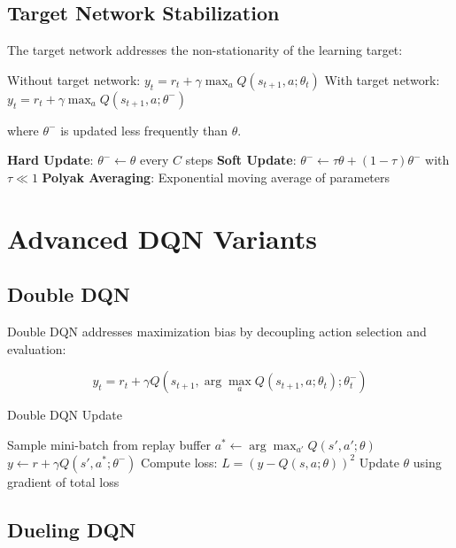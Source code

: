 \subsection{Target Network Stabilization}

The target network addresses the non-stationarity of the learning target:

Without target network: $y_t = r_t + \gamma \max_a Q(s_{t+1}, a; \theta_t)$
With target network: $y_t = r_t + \gamma \max_a Q(s_{t+1}, a; \theta^-)$

where $\theta^-$ is updated less frequently than $\theta$.

\begin{examplebox}
\textbf{Hard Update}: $\theta^- \leftarrow \theta$ every $C$ steps
\textbf{Soft Update}: $\theta^- \leftarrow \tau \theta + (1-\tau) \theta^-$ with $\tau \ll 1$
\textbf{Polyak Averaging}: Exponential moving average of parameters
\end{examplebox}

\section{Advanced DQN Variants}

\subsection{Double DQN}

Double DQN addresses maximization bias by decoupling action selection and evaluation:

\begin{equation}
y_t = r_t + \gamma Q(s_{t+1}, \arg\max_a Q(s_{t+1}, a; \theta_t); \theta^-_t)
\end{equation}

\begin{algorithm}
\caption{Double DQN Update}
\begin{algorithmic}
\STATE Sample mini-batch from replay buffer
    \STATE $a^* \leftarrow \arg\max_{a'} Q(s', a'; \theta)$ 
    \STATE $y \leftarrow r + \gamma Q(s', a^*; \theta^-)$ 
    \STATE Compute loss: $L = (y - Q(s, a; \theta))^2$
\ENDFOR
\STATE Update $\theta$ using gradient of total loss
\end{algorithmic}
\end{algorithm}

\subsection{Dueling DQN}

